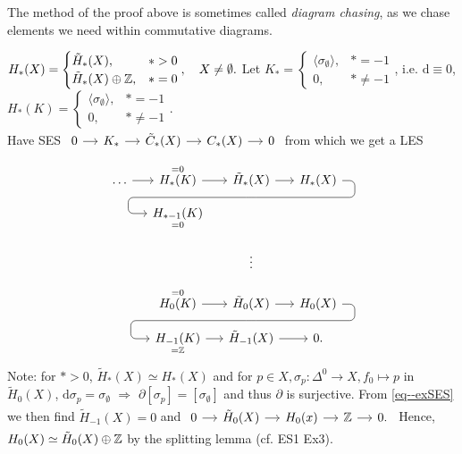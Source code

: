 \documentclass[a4paper,11pt]{article}
\begin{document}
				\begin{remark}
					The method of the proof above is sometimes called {\itshape diagram chasing}, as we chase elements we need within commutative diagrams.
				\end{remark}

				\begin{eg}
					$H_\ast(X)=\begin{cases}
						\tilde{H}_\ast(X),&\ast>0\\
						\tilde{H}_\ast(X)\oplus\mathbb{Z},&\ast=0
					\end{cases},\quad X\neq\emptyset.$ Let $K_\ast=\begin{cases}
						\langle \sigma_\emptyset\rangle,&\ast=-1\\
						0,&\ast\neq-1
					\end{cases}$, i.e. $\mathrm{d}\equiv0$, $H_\ast(K)=\begin{cases}
						\langle \sigma_\emptyset\rangle,&\ast=-1\\
						0,&\ast\neq-1
					\end{cases}$.\\Have SES $\begin{tikzcd}[column sep=small]
						0\ar[r] & K_\ast \ar[r] & \tilde{C}_\ast(X)\ar[r] & C_\ast(X)\ar[r] & 0
					\end{tikzcd}$ from which we get a LES
					\begin{equation}\label{eq--exSES}
						\begin{tikzcd}[row sep=small,column sep=small]
							\dots \ar[r] & \overset{=0}{H_{\ast}(K)}\ar[r] & \tilde{H}_{\ast}(X) \ar[r]\ar[d, phantom, ""{coordinate, name=Z}] & H_{\ast}(X) \ar[dll,
							rounded corners,
							to path={ -- ([xshift=1em]\tikztostart.east) 
							|- (Z) [near end]\tikztonodes 
							-| ([xshift=-1.5em]\tikztotarget.west) 
							-- (\tikztotarget)}]\\
							& \underset{=0}{H_{\ast-1}(K)} & \phantom{k} & 
							\\
							& & \vdots & \\
							& \overset{=0}{H_0(K)}\ar[r] & \tilde{H}_0(X)\ar[r]\ar[d, phantom, ""{coordinate, name=Z}] & H_0(X)
							\ar[dll,
							rounded corners,
							to path={ -- ([xshift=1em]\tikztostart.east) 
							|- (Z) [near end]\tikztonodes 
							-| ([xshift=-1.5em]\tikztotarget.west) 
							-- (\tikztotarget)}]\\
							& \underset{=\Z}{H_{-1}(K)} \ar[r] & \tilde{H}_{-1}(X)\ar[r] & 0. &
						\end{tikzcd}
					\end{equation} Note: for $\ast>0$, $\tilde{H}_\ast(X)\simeq H_\ast(X)$ and for $p\in X, \sigma_p:\Delta^0\rightarrow X,f_0\mapsto p$ in $\tilde{H}_0(X)$, $\mathrm{d}\sigma_p=\sigma_\emptyset$ $\Longrightarrow$ $\partial[\sigma_p]=[\sigma_\emptyset]$ and thus $\partial$ is surjective. From \eqref{eq--exSES} we then find $\tilde{H}_{-1}(X)=0$ and $\begin{tikzcd}
						[column sep=small]0\ar[r] & \tilde{H}_0(X)\ar[r] & H_0(x)\ar[r] & \Z\ar[r] & 0.
					\end{tikzcd}$ Hence, $H_0(X)\simeq\tilde{H}_0(X)\oplus\mathbb{Z}$ by the splitting lemma (cf. ES1 Ex3).
				\end{eg}
\end{document}
